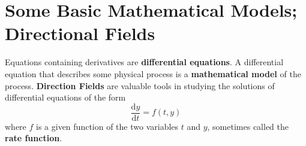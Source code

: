 \section{Some Basic Mathematical Models; Directional Fields}
    Equations containing derivatives are \textbf{differential equations}. 
    \newline
    A differential equation that describes some physical process is a \textbf{mathematical model} of the process.
    \newline
    \textbf{Direction Fields} are valuable tools in studying the solutions of differential equations of the form
    \begin{equation*}
        \frac{\mathrm{d}y}{\mathrm{d}t} = f(t, y)
    \end{equation*}
    where $f$ is a given function of the two variables $t$ and $y$, sometimes called the \textbf{rate function}.